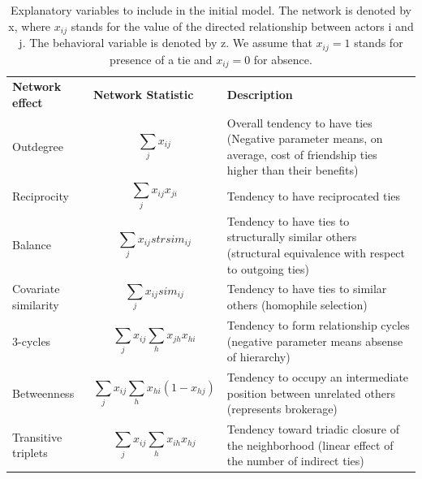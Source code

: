\documentclass{acm_proc_article-sp}
\begin{document}
\begin{table}[!ht]
\centering
\caption{Explanatory variables to include in the initial model. \cite{Steglich} The network is denoted by x, where $ x_{ij} $ stands for the value of the directed relationship between actors i and j. The behavioral variable is denoted by z. We assume that $ x_{ij} = 1 $ stands for presence of a tie and $ x_{ij} = 0 $ for absence. } 
\label{tableCovariates}
\begin{tabular}{m{} m{} m{}} 
\hline\noalign{\smallskip}
\textbf{Network effect} & \textbf{Network Statistic} & \textbf{Description} \\
\noalign{\smallskip}\hline\noalign{\smallskip}
Outdegree & \begin{equation*} \sum_j x_{ij} \end{equation*} & Overall tendency to have ties (Negative parameter means, on average, cost of friendship ties higher than their benefits) \\ 
Reciprocity & \begin{equation*} \sum_j x_{ij} x_{ji} \end{equation*} & Tendency to have reciprocated ties \\ 
Balance & \begin{equation*} \sum_j x_{ij}strsim_{ij} \end{equation*} & Tendency to have ties to structurally similar others (structural equivalence with respect to outgoing ties) \\ 
Covariate similarity & \begin{equation*} \sum_j x_{ij} sim_{ij} \end{equation*} & Tendency to have ties to similar others (homophile selection) \\ 
3-cycles & \begin{equation*} \sum_j x_{ij} \sum_h x_{jh}x_{hi} \end{equation*} & Tendency to form relationship cycles (negative parameter means absense of hierarchy) \\
Betweenness & \begin{equation*} \sum_j x_{ij} \sum_h x_{hi}(1 - x_{hj}) \end{equation*} & Tendency to occupy an intermediate position between unrelated others (represents brokerage) \\ 
Transitive triplets & \begin{equation*} \sum_j x_{ij} \sum_h x_{ih}x_{hj} \end{equation*} &  Tendency toward triadic closure of the neighborhood (linear effect of the number of indirect ties) \\

\end{tabular}
\end{table}
\end{document}
